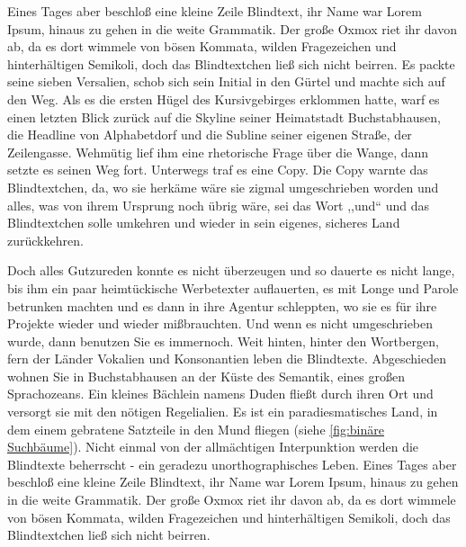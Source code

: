 \documentclass[12pt,a4paper,twoside]{scrartcl}
\numberwithin{equation}{section}
\begin{document}
Eines Tages \cite{Cormen2001introduction} aber beschloß eine kleine Zeile Blindtext, ihr Name war Lorem Ipsum, hinaus zu gehen in die weite Grammatik. Der große Oxmox riet ihr davon ab, da es dort wimmele von bösen Kommata, wilden Fragezeichen und hinterhältigen Semikoli, doch das Blindtextchen ließ sich nicht beirren. Es packte seine sieben Versalien, schob sich sein Initial in den Gürtel und machte sich auf den Weg. Als es die ersten Hügel des Kursivgebirges erklommen hatte, warf es einen letzten Blick zurück auf die Skyline seiner Heimatstadt Buchstabhausen, die Headline von Alphabetdorf und die Subline seiner eigenen Straße, der Zeilengasse. Wehmütig lief ihm eine rhetorische Frage über die Wange, dann setzte es seinen Weg fort. Unterwegs traf es eine Copy. Die Copy warnte das Blindtextchen, da, wo sie herkäme wäre sie zigmal umgeschrieben worden und alles, was von ihrem Ursprung noch übrig wäre, sei das Wort ,,und`` und das Blindtextchen solle umkehren und wieder in sein eigenes, sicheres Land zurückkehren.

Doch alles Gutzureden konnte es nicht überzeugen und so dauerte es nicht lange, bis ihm ein paar heimtückische Werbetexter auflauerten, es mit Longe und Parole betrunken machten und es dann in ihre Agentur schleppten, wo sie es für ihre Projekte wieder und wieder mißbrauchten. Und wenn es nicht umgeschrieben wurde, dann benutzen Sie es immernoch. Weit hinten, hinter den Wortbergen, fern der Länder Vokalien und Konsonantien leben die Blindtexte. Abgeschieden wohnen Sie in Buchstabhausen an der Küste des Semantik, eines großen Sprachozeans. Ein kleines Bächlein namens Duden fließt durch ihren Ort und versorgt sie mit den nötigen Regelialien. Es ist ein paradiesmatisches Land, in dem einem gebratene Satzteile in den Mund fliegen (siehe \autoref{fig:binäre Suchbäume}). Nicht einmal von der allmächtigen Interpunktion werden die Blindtexte beherrscht - ein geradezu unorthographisches Leben. Eines Tages aber beschloß eine kleine Zeile Blindtext, ihr Name war Lorem Ipsum, hinaus zu gehen in die weite Grammatik. Der große Oxmox riet ihr davon ab, da es dort wimmele von bösen Kommata, wilden Fragezeichen und hinterhältigen Semikoli, doch das Blindtextchen ließ sich nicht beirren.
\end{document}
